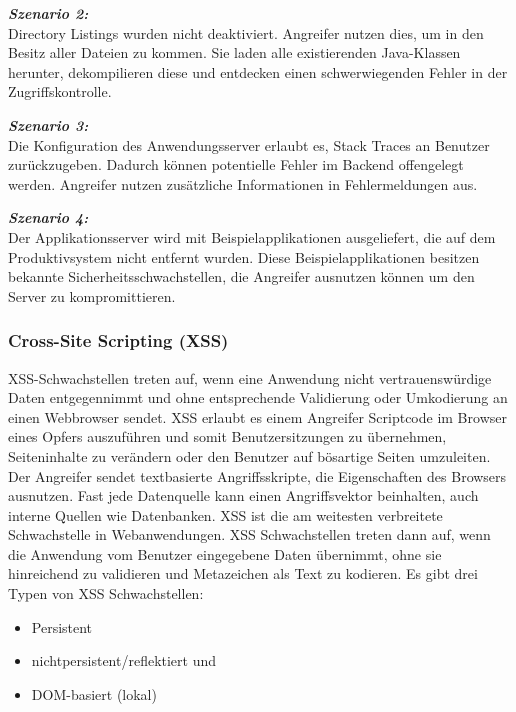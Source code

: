 \textbf{\textit{Szenario 2:}}\\
Directory Listings wurden nicht deaktiviert.
Angreifer nutzen dies, um in den Besitz aller Dateien zu
kommen. Sie laden alle existierenden Java-Klassen herunter,
dekompilieren diese und entdecken einen schwerwiegenden
Fehler in der Zugriffskontrolle\cite[12]{owasp17top10}.

\textbf{\textit{Szenario 3:}}\\
Die Konfiguration des Anwendungsserver erlaubt
es, Stack Traces an Benutzer zurückzugeben. Dadurch können
potentielle Fehler im Backend offengelegt werden. Angreifer
nutzen zusätzliche Informationen in Fehlermeldungen aus\cite[12]{owasp17top10}.

\textbf{\textit{Szenario 4:}}\\
Der Applikationsserver wird mit Beispielapplikationen
ausgeliefert, die auf dem Produktivsystem nicht
entfernt wurden. Diese Beispielapplikationen besitzen
bekannte Sicherheitsschwachstellen, die Angreifer ausnutzen
können um den Server zu kompromittieren\cite[12]{owasp17top10}.

\subsubsection{Cross-Site Scripting (XSS)}

XSS-Schwachstellen treten auf, wenn eine Anwendung nicht vertrauenswürdige Daten entgegennimmt und ohne entsprechende Validierung oder Umkodierung an einen Webbrowser sendet. XSS erlaubt es einem Angreifer Scriptcode im Browser eines Opfers auszuführen und somit Benutzersitzungen zu übernehmen, Seiteninhalte zu verändern oder den Benutzer auf bösartige
Seiten umzuleiten\cite[6]{owasp17top10}. Der Angreifer sendet textbasierte Angriffsskripte, die Eigenschaften des Browsers ausnutzen. Fast jede Datenquelle kann einen Angriffsvektor beinhalten, auch interne Quellen wie Datenbanken. XSS ist die am weitesten verbreitete Schwachstelle in Webanwendungen. XSS Schwachstellen treten dann auf, wenn die Anwendung vom Benutzer eingegebene Daten übernimmt, ohne sie hinreichend zu validieren und Metazeichen als Text zu kodieren. Es gibt drei Typen von XSS Schwachstellen:
\begin{itemize}
	\item Persistent
	\item nichtpersistent/reflektiert und
	\item DOM-basiert (lokal)
\end{itemize}

